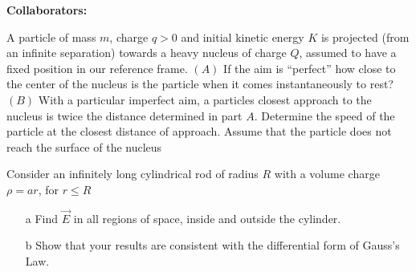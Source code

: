 \documentclass[11pt,letterpaper,boxed]{hmcpset}
\begin{document}
\noindent\textbf{Collaborators:} 


\begin{problem}
A particle of mass $m$, charge $q > 0$ and initial kinetic energy $K$ is projected (from an infinite separation) towards a heavy nucleus of charge $Q$, assumed to have a fixed position in our reference frame. $(A)$ If the aim is ``perfect'' how close to the center of the nucleus is the particle when it comes instantaneously to rest? $(B)$ With a particular imperfect aim, a particles closest approach to the nucleus is twice the distance determined in part $A$. Determine the speed of the particle at the closest distance of approach. Assume that the particle does not reach the surface of the nucleus
\end{problem}

\begin{solution}
\vfill
\end{solution}
\newpage

\begin{problem}[2.]
Consider an infinitely long cylindrical rod of radius $R$ with a volume charge $\rho = a r $, for $r \leq R$ 
\begin{enumerate}
\item[a] Find $\vec{E}$ in all regions of space, inside and outside the cylinder. 
\item[b] Show that your results are consistent with the differential form of Gauss's Law. 
\end{enumerate}

\end{problem}

\begin{solution}
\vfill
\end{solution}
\newpage
\end{document}
